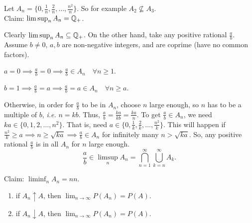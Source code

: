 \documentclass[class=article,crop=false]{standalone}
\begin{document}
\begin{eg}[]
Let $A_n = \{0,\frac{1}{n}, \frac{2}{n},\ldots, \frac{n^2}{n}\} $. So for example $A_2 \not \subseteq A_3$.\\

Claim: $\limsup_{ n} A_n = \mathbb{Q}_+$.
\begin{prf}
	Clearly $\limsup_{ n} A_n \subseteq \mathbb{Q}_+$. On the other hand, take any positive rational $\frac{a}{b}$. Assume $b \neq 0$,  $a,b$ are non-negative integers, and are coprime (have no common factors). 
\begin{case}[1]
$a=0 \implies \frac{a}{b} = 0 \implies \frac{a}{b} \in A_n \quad \forall n \geq 1$.
\end{case}
\begin{case}[2]
$b=1 \implies \frac{a}{b}=a \implies \frac{a}{b} =a \in A_n \quad \forall n \geq a$.
\end{case}
\begin{case}[3]
Otherwise, in order for $\frac{a}{b}$ to be in $A_n$, choose $n$ large enough, so $n$ has to be a multiple of $b$, \emph{i.e.} $n = kb$. Thus,  $\frac{a}{b} = \frac{ka}{kb} = \frac{ka}{n}$. To get $\frac{a}{b} \in A_n$, we need $ka \in \{0,1,2,\ldots,n^2\} $. That is, need $ a \in \{ 0, \frac{1}{k} , \frac{2}{k},\ldots, \frac{n^2}{k}\} $. This will happen if $\frac{n^2}{k}\geq a \implies n\geq \sqrt{ka} \implies \frac{a}{b} \in A_n$ for infinitely many $n > \sqrt{ka}$. So, any positive rational $\frac{a}{b}$ is in all $A_n$ for $n$ large enough. 
\[
\frac{a}{b} \in \limsup_{ n} A_n = \bigcap_{ n= 1}^{\infty} \bigcup_{k= n}^{\infty} A_k
.\] 
\end{case}
\end{prf}
\end{eg}

\begin{eg}[]
Claim: $\liminf_{ n} A_n = nn$.
\end{eg}

\begin{thm}
\begin{enumerate}[label=(\roman*)]
	\item if $A_n \uparrow A$, then $\lim_{ n \to \infty} P(A_n) = P(A)$.
	\item if $A_n \downarrow A$, then $\lim_{ n \to \infty} P(A_n) =P(A)$.
\end{enumerate}
\end{thm}
\end{document}
